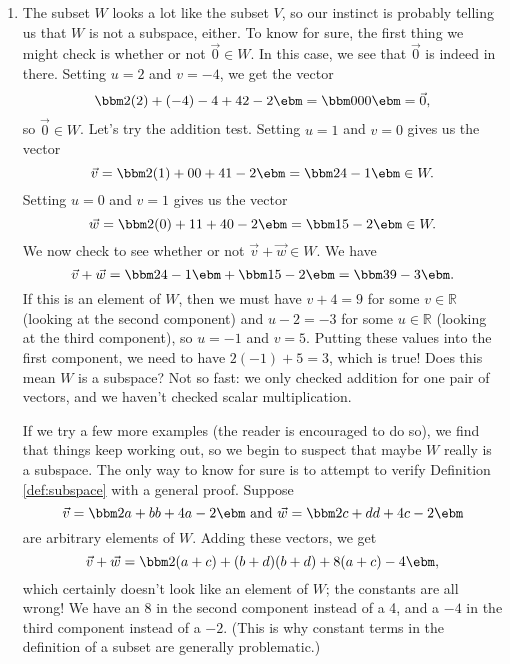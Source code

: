 {\begin{enumerate}
\item The subset $W$ looks a lot like the subset $V$, so our instinct is probably telling us that $W$ is not a subspace, either. To know for sure, the first thing we might check is whether or not $\vec 0 \in W$. In this case, we see that $\vec 0$ is indeed in there. Setting $u=2$ and $v=-4$, we get the vector
\[
\bbm 2(2)+(-4)\\-4+4\\2-2\ebm = \bbm 0\\0\\0\ebm = \vec 0,
\]
so $\vec 0 \in W$. Let's try the addition test. Setting $u=1$ and $v=0$ gives us the vector
\[
\vec v = \bbm 2(1)+0\\0+4\\1-2\ebm = \bbm 2\\4\\-1\ebm \in W.
\]
Setting $u=0$ and $v=1$ gives us the vector
\[
\vec w = \bbm 2(0)+1\\1+4\\0-2\ebm = \bbm 1\\5\\-2\ebm \in W.
\]
We now check to see whether or not $\vec v + \vec w \in W$. We have
\[
\vec v + \vec w = \bbm 2\\4\\-1\ebm + \bbm 1\\5\\-2\ebm = \bbm 3\\9\\-3\ebm.
\]
If this is an element of $W$, then we must have $v+4=9$ for some $v\in\mathbb{R}$ (looking at the second component) and $u-2=-3$ for some $u\in \mathbb{R}$ (looking at the third component), so $u=-1$ and $v=5$. Putting these values into the first component, we need to have $2(-1)+5=3$, which is true! Does this mean $W$ is a subspace? Not so fast: we only checked addition for one pair of vectors, and we haven't checked scalar multiplication.

\drawexampleline

If we try a few more examples (the reader is encouraged to do so), we find that things keep working out, so we begin to suspect that maybe $W$ really is a subspace. The only way to know for sure is to attempt to verify Definition \ref{def:subspace} with a general proof. Suppose
\[
\vec v = \bbm 2a+b\\b+4\\a-2\ebm \text{ and } \vec w = \bbm 2c+d\\d+4\\c-2\ebm
\]
are arbitrary elements of $W$. Adding these vectors, we get
\[
\vec v + \vec w = \bbm 2(a+c)+(b+d)\\ (b+d)+8\\(a+c)-4\ebm,
\]
which certainly doesn't look like an element of $W$; the constants are all wrong! We have an 8 in the second component instead of a 4, and a $-4$ in the third component instead of a $-2$. (This is why constant terms in the definition of a subset are generally problematic.)


\end{enumerate}}
